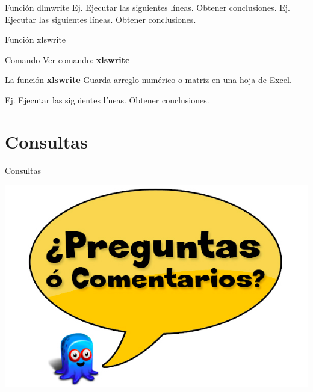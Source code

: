 \documentclass{bredelebeamer}
\begin{document}
\begin{frame}{Función dlmwrite}
Ej. Ejecutar las siguientes líneas. Obtener conclusiones.
Ej. Ejecutar las siguientes líneas. Obtener conclusiones.
\end{frame}

\begin{frame}{Función xlswrite}
\begin{exampleblock}{Comando}
Ver comando: \textbf{xlswrite}
\end{exampleblock}
La función \textbf{xlswrite} Guarda arreglo numérico o matriz en una hoja de Excel.

Ej. Ejecutar las siguientes líneas. Obtener conclusiones.
\end{frame}




\section{Consultas}
\begin{frame}{Consultas}
\begin{center}
\includegraphics[scale=0.3]{images/consultas.png}
\end{center}
\end{frame}
\end{document}
